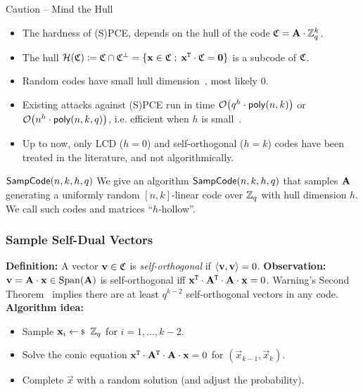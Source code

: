 \documentclass[xcolor=table,10pt,aspectratio=169]{beamer}
\begin{document}
\begin{frame}{Caution -- Mind the Hull}
  \begin{itemize}[label=\textbullet]
  \item The hardness of (S)PCE, depends on the hull of the code \(\mathfrak{C} = \mathbf{A} \cdot \mathbb{Z}_q^k\).
  \item The hull \(\mathcal{H}(\mathfrak{C}) \coloneqq \mathfrak{C} \cap \mathfrak{C}^\bot = \left\{ \mathbf{x} \in \mathfrak{C} \; ; \;  \mathbf{x}^{\mathtt{T}} \cdot \mathfrak{C} = \mathbf{0} \right\}\) is a subcode of \(\mathfrak{C}\).
  \item Random codes have small hull dimension~\cite{Sendrier1997}, most likely \(0\).
  \item Existing attacks against (S)PCE run in time \(\bigO{q^h \cdot \poly[n,k]}\) or \(\bigO{n^h \cdot \poly[n,k,q]}\), i.e. efficient when \(h\) is small~\cite{Sendrier2000SSA,BOST2019}.
  \item Up to now, only LCD (\(h=0\)) and self-orthogonal (\(h=k\)) codes have been treated in the literature, and not algorithmically.
  \end{itemize}


  \begin{block}{\(\mathsf{SampCode}(n,k,h,q)\)}
    We give an algorithm \(\mathsf{SampCode}(n,k,h,q)\) that samples \(\mathbf{A}\) generating a uniformly random \([n,k]\)-linear code over \(\mathbb{Z}_q\) with hull dimension \(h\). We call such codes and matrices ``\(h\)-hollow''.
  \end{block}
\end{frame}


\begin{frame}
  \frametitle{Sample Self-Dual Vectors}
  \textbf{Definition:} A vector \(\mathbf{v} \in \mathfrak{C}\) is \emph{self-orthogonal} if \(\langle \mathbf{v}, \mathbf{v} \rangle = 0\).
  \vfill
  \textbf{Observation:} \(\mathbf{v} = \mathbf{A}\cdot\mathbf{x} \in \operatorname{Span}(\mathbf{A})\) is self-orthogonal iff \(\mathbf{x}^{\mathtt{T}}\cdot\mathbf{A}^{\mathtt{T}}\cdot\mathbf{A}\cdot\mathbf{x} = 0\).
  \vfill
  Warning's Second Theorem~\cite{ChevalleyWarning1935} implies there are at least \(q^{k-2}\) self-orthogonal vectors in any code.
  \vfill
  \textbf{Algorithm idea:}
  \begin{itemize}[label=\textbullet]
  \item Sample \(\vec{x}_i \sample \ZZ_q\) for \(i=1,\dots,k-2\).
  \item Solve the conic equation \(\mathbf{x}^{\mathtt{T}}\cdot\mathbf{A}^{\mathtt{T}}\cdot\mathbf{A}\cdot\mathbf{x} = 0\) for \((\vec{x}_{k-1},\vec{x}_k)\).
  \item Complete \(\vec{x}\) with a random solution (and adjust the probability).
  \end{itemize}
\end{frame}
\end{document}
